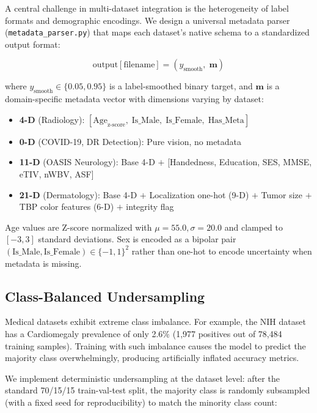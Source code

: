 \documentclass[12pt,a4paper]{report}
\begin{document}
A central challenge in multi-dataset integration is the heterogeneity of label formats and demographic encodings. We design a universal metadata parser (\texttt{metadata\_parser.py}) that maps each dataset's native schema to a standardized output format:

\begin{equation}
    \text{output}[\text{filename}] = \left( y_{\text{smooth}}, \; \mathbf{m} \right)
    \label{eq:metadata_format}
\end{equation}

\noindent where $y_{\text{smooth}} \in \{0.05, 0.95\}$ is a label-smoothed binary target, and $\mathbf{m}$ is a domain-specific metadata vector with dimensions varying by dataset:

\begin{itemize}
    \item \textbf{4-D} (Radiology): $[\text{Age}_{\text{z-score}}, \; \text{Is\_Male}, \; \text{Is\_Female}, \; \text{Has\_Meta}]$
    \item \textbf{0-D} (COVID-19, DR Detection): Pure vision, no metadata
    \item \textbf{11-D} (OASIS Neurology): Base 4-D $+$ [Handedness, Education, SES, MMSE, eTIV, nWBV, ASF]
    \item \textbf{21-D} (Dermatology): Base 4-D $+$ Localization one-hot (9-D) $+$ Tumor size $+$ TBP color features (6-D) $+$ integrity flag
\end{itemize}

Age values are Z-score normalized with $\mu = 55.0, \sigma = 20.0$ and clamped to $[-3, 3]$ standard deviations. Sex is encoded as a bipolar pair $(\text{Is\_Male}, \text{Is\_Female}) \in \{-1, 1\}^2$ rather than one-hot to encode uncertainty when metadata is missing.

\subsection{Class-Balanced Undersampling}

Medical datasets exhibit extreme class imbalance. For example, the NIH dataset has a Cardiomegaly prevalence of only 2.6\% (1,977 positives out of 78,484 training samples). Training with such imbalance causes the model to predict the majority class overwhelmingly, producing artificially inflated accuracy metrics.

We implement deterministic undersampling at the dataset level: after the standard 70/15/15 train-val-test split, the majority class is randomly subsampled (with a fixed seed for reproducibility) to match the minority class count:
\end{document}
